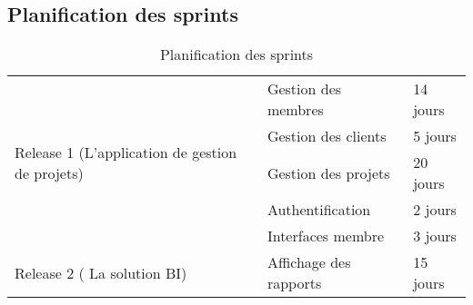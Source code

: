 \subsection{ Planification des sprints}
\FloatBarrier
\begin{table}

\begin{tabular}{|l|l|l|}
\hline
\multirow{5}{*}{Release 1 (L’application de gestion de projets)} & Gestion des membres    & 14 jours  \\
\cline{2-3}
                                                                 & Gestion des clients    & 5 jours   \\
\cline{2-3}
                                                                 & Gestion des projets    & 20 jours  \\
\cline{2-3}
                                                                 & Authentification       & 2 jours   \\
\cline{2-3}
                                                                 & Interfaces membre      & 3 jours   \\
\hline
Release 2 ( La solution BI)                 & Affichage des rapports & 15 jours  \\
\hline
\end{tabular}
\centering
\caption{ Planification des sprints}
\end{table}
\FloatBarrier 
